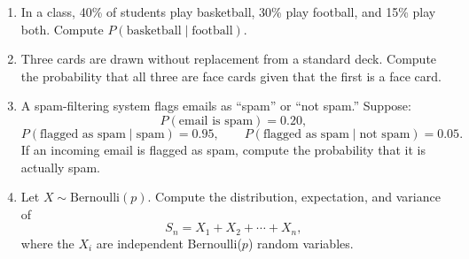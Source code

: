 \begin{enumerate}
\item 
In a class, 40\% of students play basketball, 30\% play football, and 15\% play both.  
Compute $P(\text{basketball}\mid\text{football})$.

\item Three cards are drawn without replacement from a standard deck.
Compute the probability that all three are face cards given that the first is a face card.

\item
A spam-filtering system flags emails as ``spam'' or ``not spam.''  
Suppose:
\[
P(\text{email is spam})=0.20,
\]
\[
P(\text{flagged as spam} \mid \text{spam}) = 0.95,\qquad
P(\text{flagged as spam} \mid \text{not spam}) = 0.05.
\]
If an incoming email is flagged as spam, compute the probability that it is actually spam.

\item 
Let $X \sim \mathrm{Bernoulli}(p)$.  
Compute the distribution, expectation, and variance of  
\[
S_n = X_1 + X_2 + \cdots + X_n,
\]
where the $X_i$ are independent Bernoulli($p$) random variables.

\end{enumerate}
